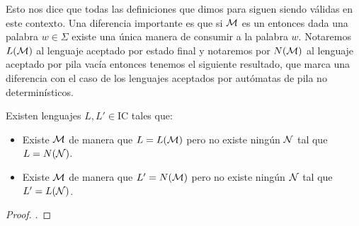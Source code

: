 \documentclass[tesis.tex]{subfiles}
\begin{document}
Esto nos dice que todas las definiciones que dimos para \APND siguen siendo válidas en este contexto.
Una diferencia importante es que si ${\cal M }$ es un \APD entonces dada una palabra $w \in \Sigma$ existe una única manera de consumir a la palabra $w$.
Notaremos $L(\cal M)$ al lenguaje aceptado por estado final y notaremos por $N(\cal M)$ al lenguaje aceptado por pila vacía entonces tenemos el siguiente resultado, que marca una diferencia con el caso de los lenguajes aceptados por autómatas de pila no determinísticos.

\begin{teo}
	Existen lenguajes $L, L' \in \text{IC}$ tales que:
	\begin{itemize}
		\item Existe $\cal M$ \APD de manera que $L = L(\cal M)$ pero no existe ningún $\cal N$ \APD tal que $L = N(\cal N)$.
		\item Existe $\cal M$ \APD de manera que $L' = N(\cal M)$ pero no existe ningún $\cal N$ \APD tal que $L' = L(\cal N)$.
	\end{itemize} 
\end{teo}
\begin{proof}
	\cite{sipser13}.
\end{proof}
\end{document}
